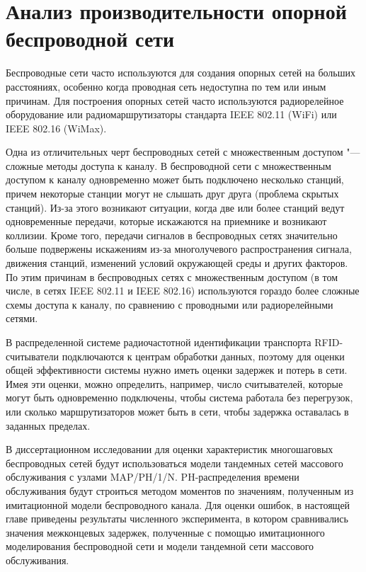 \chapter{Анализ производительности опорной беспроводной сети}\label{ch:ch4}
Беспроводные сети часто используются для создания опорных сетей на больших расстояниях, особенно когда проводная сеть недоступна по тем или иным причинам. Для построения опорных сетей часто используются радиорелейное оборудование или радиомаршрутизаторы стандарта IEEE 802.11 (WiFi) или IEEE 802.16 (WiMax).

Одна из отличительных черт беспроводных сетей с множественным доступом "--- сложные методы доступа к каналу. В беспроводной сети с множественным доступом к каналу одновременно может быть подключено несколько станций, причем некоторые станции могут не слышать друг друга (проблема скрытых станций). Из-за этого возникают ситуации, когда две или более станций ведут одновременные передачи, которые искажаются на приемнике и возникают коллизии. Кроме того, передачи сигналов в беспроводных сетях значительно больше подвержены искажениям из-за многолучевого распространения сигнала, движения станций, изменений условий окружающей среды и других факторов. По этим причинам в беспроводных сетях с множественным доступом (в том числе, в сетях IEEE 802.11 и IEEE 802.16) используются гораздо более сложные схемы доступа к каналу, по сравнению с проводными или радиорелейными сетями.

В распределенной системе радиочастотной идентификации транспорта RFID-считыватели подключаются к центрам обработки данных, поэтому для оценки общей эффективности системы нужно иметь оценки задержек и потерь в сети. Имея эти оценки, можно определить, например, число считывателей, которые могут быть одновременно подключены, чтобы система работала без перегрузок, или сколько маршрутизаторов может быть в сети, чтобы задержка оставалась в заданных пределах.

В диссертационном исследовании для оценки характеристик многошаговых беспроводных сетей будут использоваться модели тандемных сетей массового обслуживания с узлами MAP/PH/1/N. PH-распределения времени обслуживания будут строиться методом моментов по значениям, полученным из имитационной модели беспроводного канала. Для оценки ошибок, в настоящей главе приведены результаты численного эксперимента, в котором сравнивались значения межконцевых задержек, полученные с помощью имитационного моделирования беспроводной сети и модели тандемной сети массового обслуживания.

